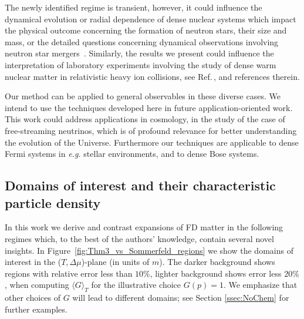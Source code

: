 \documentclass[sn-mathphys,Numbered]{sn-jnl}
\newcommand{\rf}[1]{Figure~{\ref{#1}}}
\newcommand*{\xred}{\color{black}}
\begin{document}
{The newly identified regime is transient, however, it could influence the dynamical evolution or radial dependence of dense nuclear systems  which impact the physical outcome concerning the formation of neutron stars, their size and mass, or the detailed questions concerning dynamical observations involving neutron star mergers~\cite{Raithel:2019gws,Raithel:2021hye,Blacker:2023afl,Raithel:2023zml}. Similarly, the results we present could influence the interpretation of laboratory experiments involving the study of dense warm nuclear matter in relativistic heavy ion collisions, see Ref.\,\cite{Sorensen:2023zkk}, and references therein. 
 
Our method can be applied to general observables in these diverse cases. We intend to use the techniques developed here in future application-oriented work. This work could address applications in cosmology, in the study of the case of free-streaming neutrinos, which is of profound relevance for better understanding the evolution of the Universe. Furthermore our techniques are applicable to dense Fermi systems in {\it e.g.\/} stellar environments, and to dense Bose systems.}

\subsection{Domains of interest and their characteristic particle density}\label{domains}
In this work we derive and contrast expansions of FD matter in the following regimes which, to the best of the authors' knowledge, contain several novel insights. In \rf{fig:Thm3_vs_Sommerfeld_regions} we show the domains of interest in the ($T,\Delta\mu$)-plane (in units of $m$). The darker background shows regions with relative error less than $10\%$, lighter background shows error less $20\%$, when computing $\langle G\rangle_T$ for the illustrative choice $G(p)=1$. {\xred We emphasize that other choices of $G$ will lead to different domains; see Section \ref{ssec:NoChem} for further examples.} 
\end{document}
